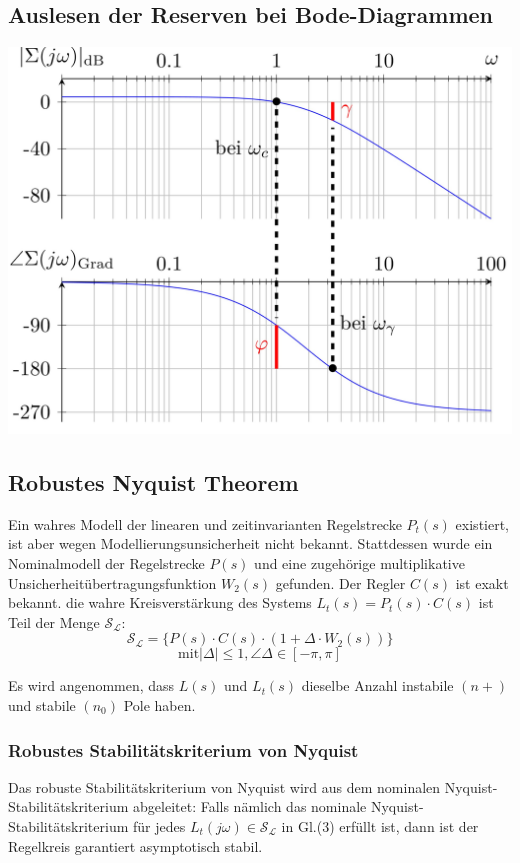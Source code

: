         \subsection{Auslesen der Reserven bei Bode-Diagrammen}
            \begin{center}
                \includegraphics[width=0.7\linewidth]{images/07/reserven_im_bode.jpg}
            \end{center}
    \subsection{Robustes Nyquist Theorem}
        Ein wahres Modell der linearen und zeitinvarianten Regelstrecke $P_t(s)$ existiert, ist aber wegen Modellierungsunsicherheit nicht bekannt. Stattdessen wurde ein Nominalmodell der Regelstrecke $P(s)$ und eine zugehörige multiplikative Unsicherheitübertragungsfunktion $W_2(s)$ gefunden. Der Regler $ C(s)$ ist exakt bekannt. die wahre Kreisverstärkung des Systems $L_t(s) = P_t(s) \cdot C(s)$ ist Teil der Menge $\mathcal{S}_\mathcal{L}$:
        \[\mathcal{S}_\mathcal{L} = \{P(s)\cdot C(s) \cdot (1+\Delta \cdot W_2(s))\}\]
        \[\textrm{mit} |\Delta| \leq 1, \angle\Delta \in [-\pi,\pi]\]
        
        Es wird angenommen, dass $L(s)$ und $L_t(s)$ dieselbe Anzahl instabile $(n+)$ und stabile $(n_0)$ Pole haben.
        
        \subsubsection{Robustes Stabilitätskriterium von Nyquist}
            Das robuste Stabilitätskriterium von Nyquist wird aus dem nominalen Nyquist-Stabilitätskriterium abgeleitet: Falls nämlich das nominale Nyquist-Stabilitätskriterium für jedes $ L_t(j\omega)\in\mathcal{S}_\mathcal{L} $ in Gl.(3) erfüllt ist, dann ist der Regelkreis garantiert asymptotisch stabil.
          
